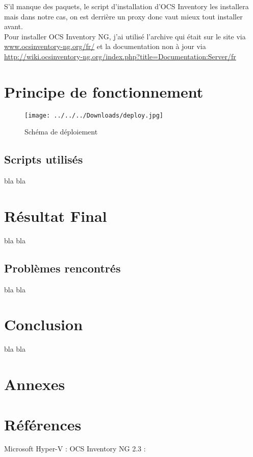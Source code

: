 \documentclass[11pt,a4paper,oneside]{article}
\begin{document}
S'il manque des paquets, le script d'installation d'OCS Inventory les installera mais dans notre cas, on est derrière un proxy donc vaut mieux tout installer avant. \\

Pour installer OCS Inventory NG, j'ai utilisé l'archive qui était sur le site via \url{www.ocsinventory-ng.org/fr/} et la documentation non à jour via \url{http://wiki.ocsinventory-ng.org/index.php?title=Documentation:Server/fr}
\section{Principe de fonctionnement}
\begin{figure}[hbtp]
\texttt{[image: ../../../Downloads/deploy.jpg]}
\caption{Schéma de déploiement}
\end{figure}


\subsection{Scripts utilisés}
bla bla
\section{Résultat Final}
bla bla
\subsection{Problèmes rencontrés}
bla bla
\section{Conclusion}
bla bla
\section{Annexes}

\section{Références}
Microsoft Hyper-V :
OCS Inventory NG 2.3 :
\end{document}
